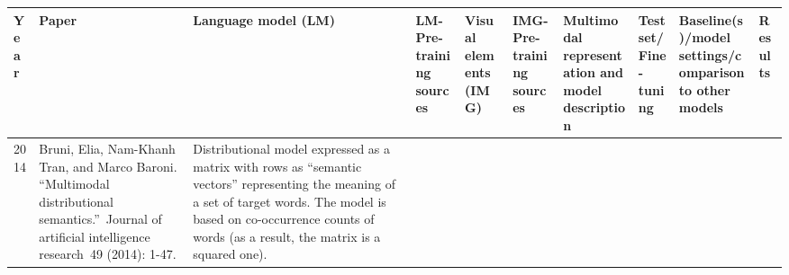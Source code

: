 \documentclass[
]{krantz}
\begin{document}
\begin{longtable}[]{@{}llllllllll@{}}
\toprule
\begin{minipage}[b]{0.00\columnwidth}\raggedright
Year\strut
\end{minipage} & \begin{minipage}[b]{0.06\columnwidth}\raggedright
Paper\strut
\end{minipage} & \begin{minipage}[b]{0.04\columnwidth}\raggedright
Language model (LM)\strut
\end{minipage} & \begin{minipage}[b]{0.02\columnwidth}\raggedright
LM-Pre-training sources\strut
\end{minipage} & \begin{minipage}[b]{0.07\columnwidth}\raggedright
Visual elements (IMG)\strut
\end{minipage} & \begin{minipage}[b]{0.05\columnwidth}\raggedright
IMG-Pre-training sources\strut
\end{minipage} & \begin{minipage}[b]{0.25\columnwidth}\raggedright
Multimodal representation and model description\strut
\end{minipage} & \begin{minipage}[b]{0.08\columnwidth}\raggedright
Testset/Fine-tuning\strut
\end{minipage} & \begin{minipage}[b]{0.05\columnwidth}\raggedright
Baseline(s)/model settings/comparison to other models\strut
\end{minipage} & \begin{minipage}[b]{0.13\columnwidth}\raggedright
Results\strut
\end{minipage}\tabularnewline
\midrule
\endhead
\begin{minipage}[t]{0.00\columnwidth}\raggedright
2014\strut
\end{minipage} & \begin{minipage}[t]{0.06\columnwidth}\raggedright
Bruni, Elia, Nam-Khanh Tran, and Marco Baroni. ``Multimodal distributional semantics.''~Journal of artificial intelligence research~49 (2014): 1-47.\strut
\end{minipage} & \begin{minipage}[t]{0.04\columnwidth}\raggedright
Distributional model expressed as a matrix with rows as ``semantic vectors'' representing the meaning of a set of target words. The model is based on co-occurrence counts of words (as a result, the matrix is a squared one).\strut

\end{minipage}
\end{longtable}
\end{document}
